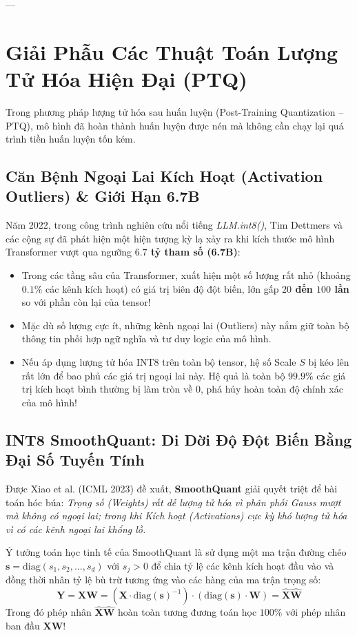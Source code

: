 ---

\section{Giải Phẫu Các Thuật Toán Lượng Tử Hóa Hiện Đại (PTQ)}
\label{sec:ptq-modern-algorithms}

Trong phương pháp lượng tử hóa sau huấn luyện (Post-Training Quantization -- PTQ), mô hình đã hoàn thành huấn luyện được nén mà không cần chạy lại quá trình tiền huấn luyện tốn kém.

\subsection{Căn Bệnh Ngoại Lai Kích Hoạt (Activation Outliers) \& Giới Hạn 6.7B}
Năm 2022, trong công trình nghiên cứu nổi tiếng \textit{LLM.int8()}, Tim Dettmers và các cộng sự đã phát hiện một hiện tượng kỳ lạ xảy ra khi kích thước mô hình Transformer vượt qua ngưỡng \textbf{$6.7$ tỷ tham số (6.7B)}:
\begin{itemize}
  \item Trong các tầng sâu của Transformer, xuất hiện một số lượng rất nhỏ (khoảng $0.1\%$ các kênh kích hoạt) có giá trị biên độ đột biến, lớn gấp \textbf{$20$ đến $100$ lần} so với phần còn lại của tensor!
  \item Mặc dù số lượng cực ít, những kênh ngoại lai (Outliers) này nắm giữ toàn bộ thông tin phối hợp ngữ nghĩa và tư duy logic của mô hình.
  \item Nếu áp dụng lượng tử hóa INT8 trên toàn bộ tensor, hệ số Scale $S$ bị kéo lên rất lớn để bao phủ các giá trị ngoại lai này. Hệ quả là toàn bộ $99.9\%$ các giá trị kích hoạt bình thường bị làm tròn về $0$, phá hủy hoàn toàn độ chính xác của mô hình!
\end{itemize}

\subsection{INT8 SmoothQuant: Di Dời Độ Đột Biến Bằng Đại Số Tuyến Tính}
Được Xiao et al. (ICML 2023) đề xuất, \textbf{SmoothQuant} giải quyết triệt để bài toán hóc búa: \textit{Trọng số (Weights) rất dễ lượng tử hóa vì phân phối Gauss mượt mà không có ngoại lai; trong khi Kích hoạt (Activations) cực kỳ khó lượng tử hóa vì có các kênh ngoại lai khổng lồ.}

Ý tưởng toán học tinh tế của SmoothQuant là sử dụng một ma trận đường chéo $\mathbf{s} = \text{diag}(s_1, s_2, \dots, s_d)$ với $s_j > 0$ để chia tỷ lệ các kênh kích hoạt đầu vào và đồng thời nhân tỷ lệ bù trừ tương ứng vào các hàng của ma trận trọng số:
\begin{equation}
\mathbf{Y} = \mathbf{X} \mathbf{W} = \left(\mathbf{X} \cdot \text{diag}(\mathbf{s})^{-1}\right) \cdot \left(\text{diag}(\mathbf{s}) \cdot \mathbf{W}\right) = \hat{\mathbf{X}} \hat{\mathbf{W}}
\end{equation}
Trong đó phép nhân $\hat{\mathbf{X}} \hat{\mathbf{W}}$ hoàn toàn tương đương toán học $100\%$ với phép nhân ban đầu $\mathbf{X} \mathbf{W}$!

